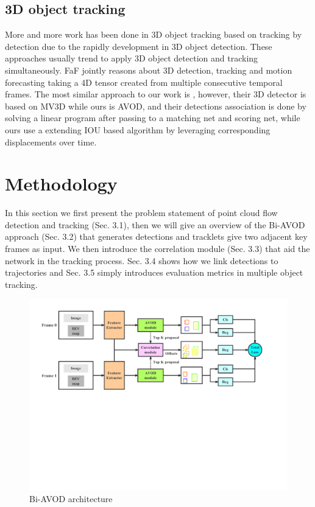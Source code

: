 \documentclass{bmvc2k}
\begin{document}
\subsection{3D object tracking}
More and more work has been done in 3D object tracking based on tracking by detection due to the rapidly development in 3D object detection. These approaches usually trend to apply 3D object detection and tracking simultaneously. FaF \cite{luo2018fast} jointly reasons about 3D detection, tracking and motion forecasting taking a 4D tensor created from multiple consecutive temporal frames. The most similar approach to our work is \cite{frossard2018end}, however, their 3D detector is based on MV3D while ours is AVOD, and their detections association is done by solving a linear program after passing to a matching net and scoring net, while ours use a extending IOU based algorithm \cite{bochinski2018extending} by leveraging corresponding displacements over time.
\section{Methodology}
\label{sec:method}
In this section we first present the problem statement of point cloud flow detection and tracking (Sec. 3.1), then we will give an overview of the Bi-AVOD approach (Sec. 3.2) that generates detections and tracklets give two adjacent key frames as input. We then introduce the correlation module (Sec. 3.3) that aid the network in the tracking process. Sec. 3.4 shows how we link detections to trajectories and Sec. 3.5 simply introduces evaluation metrics in multiple object tracking.

\begin{figure}
	\rule{0pt}{1ex}
	\setlength{\abovecaptionskip}{-1.0cm}
	\begin{center}
		\includegraphics[width=\textwidth]{images/Bi-AVOD}
	\end{center}
	\caption{Bi-AVOD architecture}
	\label{fig:bi-avod}
	\vspace{-0.4cm}
\end{figure}
\end{document}
